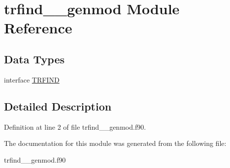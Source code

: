 \hypertarget{classtrfind____genmod}{\section{trfind\+\_\+\+\_\+genmod Module Reference}
\label{classtrfind____genmod}
}
\subsection*{Data Types}
\begin{DoxyCompactItemize}
\item 
interface \hyperlink{interfacetrfind____genmod_1_1_t_r_f_i_n_d}{T\+R\+F\+I\+N\+D}
\end{DoxyCompactItemize}


\subsection{Detailed Description}


Definition at line 2 of file trfind\+\_\+\+\_\+genmod.\+f90.



The documentation for this module was generated from the following file\+:\begin{DoxyCompactItemize}
\item 
trfind\+\_\+\+\_\+genmod.\+f90\end{DoxyCompactItemize}
